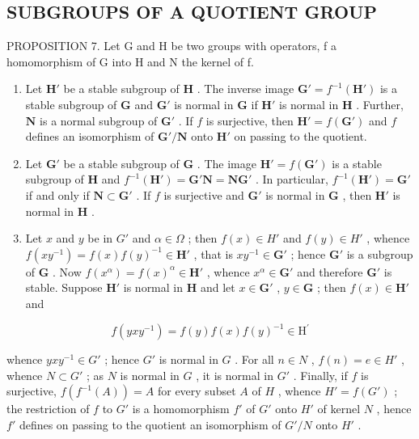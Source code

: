 \subsection{SUBGROUPS OF A QUOTIENT GROUP}

PROPOSITION 7. Let G and H be two groups with operators, f a homomorphism of G into H and N the kernel of f.

\begin{enumerate}
\def\labelenumi{(\alph{enumi})}
\item
  Let \(\mathbf{H}'\) be a stable subgroup of \(\mathbf{H}\) . The inverse image \(\mathbf{G}' = f^{-1}(\mathbf{H}')\) is a stable subgroup of \(\mathbf{G}\) and \(\mathbf{G}'\) is normal in \(\mathbf{G}\) if \(\mathbf{H}'\) is normal in \(\mathbf{H}\) . Further, \(\mathbf{N}\) is a normal subgroup of \(\mathbf{G}'\) . If \(f\) is surjective, then \(\mathbf{H}' = f(\mathbf{G}')\) and \(f\) defines an isomorphism of \(\mathbf{G}' / \mathbf{N}\) onto \(\mathbf{H}'\) on passing to the quotient.
\item
  Let \(\mathbf{G}'\) be a stable subgroup of \(\mathbf{G}\) . The image \(\mathbf{H}' = f(\mathbf{G}')\) is a stable subgroup of \(\mathbf{H}\) and \(f^{-1}(\mathbf{H}') = \mathbf{G}'\mathbf{N} = \mathbf{NG}'\) . In particular, \(f^{-1}(\mathbf{H}') = \mathbf{G}'\) if and only if \(\mathbf{N} \subset \mathbf{G}'\) . If \(f\) is surjective and \(\mathbf{G}'\) is normal in \(\mathbf{G}\) , then \(\mathbf{H}'\) is normal in \(\mathbf{H}\) .
\item
  Let \(x\) and \(y\) be in \(G'\) and \(\alpha \in \Omega\) ; then \(f(x) \in H'\) and \(f(y) \in H'\) , whence \(f(xy^{-1}) = f(x)f(y)^{-1} \in \mathbf{H}'\) , that is \(xy^{-1} \in \mathbf{G}'\) ; hence \(\mathbf{G}'\) is a subgroup of \(\mathbf{G}\) . Now \(f(x^{\alpha}) = f(x)^{\alpha} \in \mathbf{H}'\) , whence \(x^{\alpha} \in \mathbf{G}'\) and therefore \(\mathbf{G}'\) is stable. Suppose \(\mathbf{H}'\) is normal in \(\mathbf{H}\) and let \(x \in \mathbf{G}'\) , \(y \in \mathbf{G}\) ; then \(f(x) \in \mathbf{H}'\) and
\end{enumerate}

\[
f (y x y ^ {- 1}) = f (y) f (x) f (y) ^ {- 1} \in \mathrm{H} ^ {\prime}
\]

whence \(yxy^{-1} \in G'\) ; hence \(G'\) is normal in \(G\) . For all \(n \in N\) , \(f(n) = e \in H'\) , whence \(N \subset G'\) ; as \(N\) is normal in \(G\) , it is normal in \(G'\) . Finally, if \(f\) is surjective, \(f(f^{-1}(A)) = A\) for every subset \(A\) of \(H\) , whence \(H' = f(G')\) ; the restriction of \(f\) to \(G'\) is a homomorphism \(f'\) of \(G'\) onto \(H'\) of kernel \(N\) , hence \(f'\) defines on passing to the quotient an isomorphism of \(G'/N\) onto \(H'\) .

